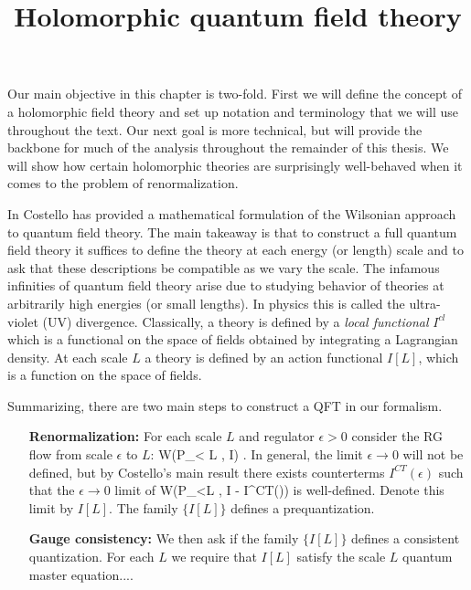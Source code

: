 \documentclass[10pt]{amsart}
\title{Holomorphic quantum field theory}
\begin{document}
\maketitle
\tableofcontents


Our main objective in this chapter is two-fold. 
First we will define the concept of a holomorphic field theory and set up notation and terminology that we will use throughout the text. 
Our next goal is more technical, but will provide the backbone for much of the analysis throughout the remainder of this thesis.
We will show how certain holomorphic theories are surprisingly well-behaved when it comes to the problem of renormalization. 

In \cite{CostelloRenormalization} Costello has provided a mathematical formulation of the Wilsonian approach to quantum field theory.
The main takeaway is that to construct a full quantum field theory it suffices to define the theory at each energy (or length) scale and to ask that these descriptions be compatible as we vary the scale.
The infamous infinities of quantum field theory arise due to studying behavior of theories at arbitrarily high energies (or small lengths). 
In physics this is called the ultra-violet (UV) divergence. 
Classically, a theory is defined by a {\em local functional} $I^{cl}$ which is a functional on the space of fields obtained by integrating a Lagrangian density.
At each scale $L$ a theory is defined by an action functional $I[L]$, which is a function on the space of fields. 

Summarizing, there are two main steps to construct a QFT in our formalism.
\begin{itemize}
\item[{\bf Renormalization:}] For each scale $L$ and regulator $\epsilon > 0$ consider the RG flow from scale $\epsilon$ to $L$:
\be
W(P_{\epsilon < L} , I) .
\ee
In general, the limit $\epsilon \to 0$ will not be defined, but by Costello's main result there exists counterterms $I^{CT}(\epsilon)$ such that the $\epsilon \to 0$ limit of 
\ben
W(P_{\epsilon<L} , I - I^{CT}(\epsilon))
\een
is well-defined. 
Denote this limit by $I[L]$.
The family $\{I[L]\}$ defines a prequantization.
\item[{\bf Gauge consistency:}] We then ask if the family $\{I[L]\}$ defines a consistent quantization.
For each $L$ we require that $I[L]$ satisfy the scale $L$ quantum master equation....
\end{itemize}
\end{document}
